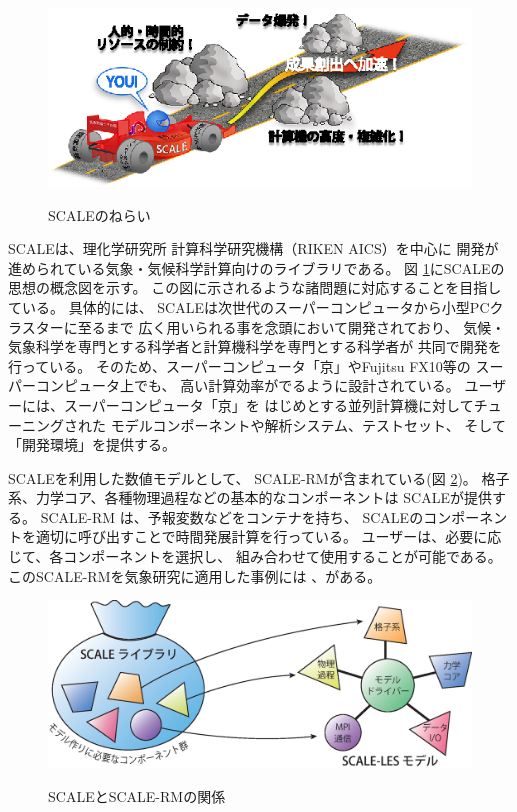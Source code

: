 \begin{figure}[bh]
\begin{center}
  \includegraphics[width=0.9\hsize]{./figure/library.eps}\\
  \caption{SCALEのねらい}
  \label{fig:scale}
\end{center}
\end{figure}

SCALEは、理化学研究所 計算科学研究機構（RIKEN AICS）を中心に
開発が進められている気象・気候科学計算向けのライブラリである。
図 \ref{fig:scale}にSCALEの思想の概念図を示す。
この図に示されるような諸問題に対応することを目指している。
具体的には、
SCALEは次世代のスーパーコンピュータから小型PCクラスターに至るまで
広く用いられる事を念頭において開発されており、
気候・気象科学を専門とする科学者と計算機科学を専門とする科学者が
共同で開発を行っている。
そのため、スーパーコンピュータ「京」やFujitsu FX10等の
スーパーコンピュータ上でも、
高い計算効率がでるように設計されている。
ユーザーには、スーパーコンピュータ「京」を
はじめとする並列計算機に対してチューニングされた
モデルコンポーネントや解析システム、テストセット、
そして「開発環境」を提供する。

SCALEを利用した数値モデルとして、
SCALE-RMが含まれている(図 \ref{fig:scale-rm})。
格子系、力学コア、各種物理過程などの基本的なコンポーネントは
SCALEが提供する。
SCALE-RM は、予報変数などをコンテナを持ち、
SCALEのコンポーネントを適切に呼び出すことで時間発展計算を行っている。
ユーザーは、必要に応じて、各コンポーネントを選択し、
組み合わせて使用することが可能である。
このSCALE-RMを気象研究に適用した事例には
\citet{satoy_2014}、\citet{satoy_2015}がある。


\begin{figure}[tb]
\begin{center}
  \includegraphics[width=0.9\hsize]{./figure/scale.eps}\\
  \caption{SCALEとSCALE-RMの関係}
  \label{fig:scale-rm}
\end{center}
\end{figure}


